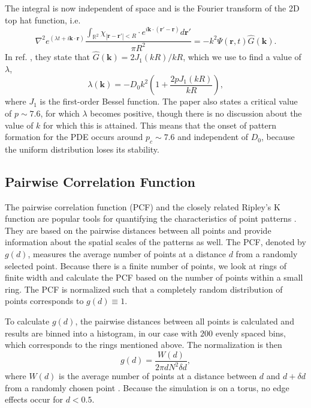\documentclass{article}
\renewcommand{\vec}[1]{\boldsymbol{#1}}
\begin{document}
The integral is now independent of space and is the Fourier transform of the 2D top hat function, i.e.
\begin{equation} 
    \nabla^2e^{(\lambda t + i \vec{k} \cdot \vec{r})}\frac{\int_{\mathbb{R}^2}\chi_{|\vec{r}-\vec{r'}|<R} \cdot e^{ i \vec{k} \cdot (\vec{r'}-\vec{r})}d\vec{r'}}{\pi R^2} = -k^2\Psi(\vec{r},t) \hat{G}(\vec{k}).
   \end{equation}
In ref. \cite{lopezMacroscopicDescriptionParticle2006}, they state that $\hat{G}(\vec{k}) = 2J_1(kR) / kR$, which we use to find a value of $\lambda$,
\begin{equation}
    \lambda(\vec{k}) = -D_0 k^2\left(1 + \frac{2pJ_1(kR)}{kR}\right),
\end{equation}
where $J_1$ is the first-order Bessel function.
The paper also states a critical value of $p\sim 7.6$, for which $\lambda $ becomes positive, though there is no discussion about the value of $k$ for which this is attained. 
This means that the onset of pattern formation for the PDE occurs around $p_c \sim 7.6$ and independent of $D_0$, because the uniform distribution loses its stability.


\subsection{Pairwise Correlation Function}
The pairwise correlation function (PCF) and the closely related Ripley's K function are popular tools for quantifying the characteristics of point patterns \autocite{wiegandRingsCirclesNullmodels2004}. 
They are based on the pairwise distances between all points and provide information about the spatial scales of the patterns as well.
The PCF, denoted by $g(d)$, measures the average number of points at a distance $d$ from a randomly selected point.
Because there is a finite number of points, we look at rings of finite width and calculate the PCF based on the number of points within a small ring.
The PCF is normalized such that a completely random distribution of points corresponds to $g(d) \equiv 1$.

To calculate $g(d)$, the pairwise distances between all points is calculated and results are binned into a histogram, in our case with $200$ evenly spaced bins, which corresponds to the rings mentioned above.
The normalization is then 
\begin{equation}
    g(d) = \frac{W(d)}{2\pi d  N^2 \delta d},
\end{equation}
where $W(d)$ is the average number of points at a distance between $d$ and $d + \delta d$ from a randomly chosen point \cite{52PairCorrelation}.
Because the simulation is on a torus, no edge effects occur for $d < 0.5$.
\end{document}
